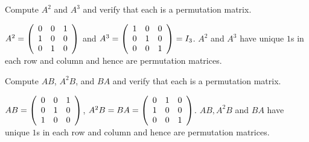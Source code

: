 \documentclass{ximera}
\begin{document}
\begin{exercise} \label{YZ_3.5_Permu4}
Compute $A^2$ and $A^3$ and verify that each is a permutation matrix.

\begin{solution}
\ans $A^2 = \left(\begin{array}{rrrrrrrrrrrrrrrrrr} 0&0&1\\1&0&0\\0&1&0 \end{array}\right)$ and $A^3 = \left(\begin{array}{rrrrrrrrrrrrrrrrrr} 1&0&0\\0&1&0\\0&0&1 \end{array}\right) = I_3$. $A^2$ and $A^3$ have unique $1$s in each row and column and hence are permutation matrices.
\end{solution}


\end{exercise}

\begin{exercise} \label{YZ_3.5_Permu5}
Compute $AB$, $A^2B$, and $BA$ and verify that each is a permutation matrix.

\begin{solution}
\ans 
$AB=\left(\begin{array}{rrrrrrrrrrrrrrrrrr} 0&0&1\\0&1&0\\1&0&0 \end{array}\right)$, $A^2B=BA=\left(\begin{array}{rrrrrrrrrrrrrrrrrr} 0&1&0\\1&0&0\\0&0&1 \end{array}\right)$. $AB, A^2B$ and $BA$ have unique $1$s in each row and column and hence are permutation matrices.


\end{solution}
\end{exercise}
\end{document}
